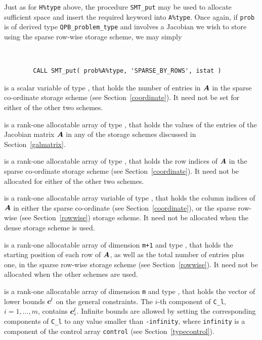 \documentclass{galahad}
\newcommand{\packagename}{QPB}
\begin{document}
\begin{description}
\begin{description}
Just as for {\tt H\%type} above, the procedure {\tt SMT\_put} 
may be used to allocate sufficient space and insert the required keyword
into {\tt A\%type}.
Once again, if {\tt prob} is of derived type {\tt \packagename\_problem\_type}
and involves a Jacobian we wish to store using the sparse row-wise 
storage scheme, we may simply
{\tt 
\begin{verbatim}
        CALL SMT_put( prob%A%type, 'SPARSE_BY_ROWS', istat )
\end{verbatim}
}
\noindent

 is a scalar variable of type \integer, that 
holds the number of entries in ${\bm{A}}$
in the sparse co-ordinate storage scheme (see Section~\ref{coordinate}). 
It need not be set for either of the other two schemes.

 is a rank-one allocatable array of type \realdp, that holds
the values of the entries of the Jacobian matrix ${\bm{A}}$ in any of the 
storage schemes discussed in Section~\ref{galmatrix}.

 is a rank-one allocatable array of type \integer,
that holds the row indices of ${\bm{A}}$ in the sparse co-ordinate storage
scheme (see Section~\ref{coordinate}). 
It need not be allocated for either of the other two schemes.

 is a rank-one allocatable array variable of type \integer,
that holds the column indices of ${\bm{A}}$ in either the sparse co-ordinate 
(see Section~\ref{coordinate}), or the sparse row-wise 
(see Section~\ref{rowwise}) storage scheme.
It need not be allocated when the dense storage scheme is used.

 is a rank-one allocatable array of dimension {\tt m+1} and type 
\integer, that holds the 
starting position of each row of ${\bm{A}}$, as well
as the total number of entries plus one, in the sparse row-wise storage
scheme (see Section~\ref{rowwise}). It need not be allocated when the
other schemes are used.

\end{description}

 is a rank-one allocatable array of dimension {\tt m} and type 
\realdp, that holds the vector of lower bounds ${\bm{c}}^{l}$ 
on the general constraints. The $i$-th component of 
{\tt C\_l}, $i = 1, \ldots , m$, contains ${\bm{c}}_{i}^{l}$.
Infinite bounds are allowed by setting the corresponding 
components of {\tt C\_l} to any value smaller than {\tt -infinity}, 
where {\tt infinity} is a component of the control array {\tt control} 
(see Section~\ref{typecontrol}).


\end{description}
\end{document}
